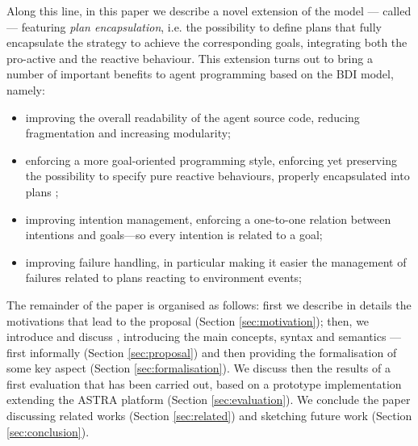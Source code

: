 %
Along this line, in this paper we describe a novel extension of the
{\asl} model --- called {\aser} --- featuring \emph{plan
  encapsulation}, i.e. the possibility to define plans that fully
encapsulate the strategy to achieve the corresponding goals,
integrating both the pro-active and the reactive behaviour.
%
%
This extension turns out to bring a number of important benefits to
agent programming based on the BDI model, namely:
%
\begin{itemize}
\item improving the overall readability of the agent source code, reducing fragmentation and increasing modularity;
\item enforcing a more goal-oriented programming style, enforcing  yet preserving the possibility to specify pure reactive behaviours, properly encapsulated into plans ;
\item improving intention management, enforcing a one-to-one relation between intentions and goals---so every intention is related to a goal; 
\item improving failure handling, in particular making it easier the management of failures related to plans reacting to environment events;
\end{itemize}
%

\noindent The remainder of the paper is organised as follows:
%
first we describe in details the motivations that lead to the proposal (Section \ref{sec:motivation});
%
then, we introduce and discuss {\aser},  introducing the main
concepts, syntax and semantics --- first informally  (Section
\ref{sec:proposal}) and then providing the formalisation of some key
aspect (Section \ref{sec:formalisation}).
%
We discuss then the results of a first evaluation that has been
carried out, based on a prototype implementation extending the ASTRA
platform (Section \ref{sec:evaluation}).
%
We conclude the paper discussing related works (Section \ref{sec:related})
and sketching future work (Section \ref{sec:conclusion}).


